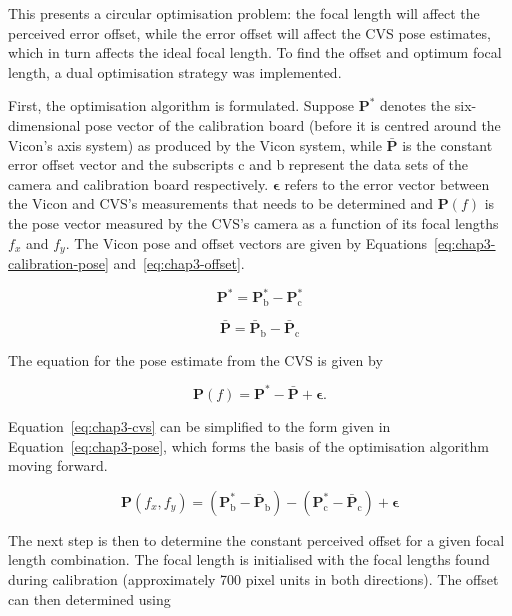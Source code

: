 This presents a circular optimisation problem: the focal length will affect the perceived error offset, while the error offset will affect the CVS pose estimates, which in turn affects the ideal focal length. To find the offset and optimum focal length, a dual optimisation strategy was implemented.  

First, the optimisation algorithm is formulated. Suppose $\bm{P}^*$ denotes the six-dimensional pose vector of the calibration board (before it is centred around the Vicon's axis system) as produced by the Vicon system, while $\bar{\bm{P}}$ is the constant error offset vector and the subscripts c and b represent the data sets of the camera and calibration board respectively. $\bm{\epsilon}$ refers to the error vector between the Vicon and CVS's measurements that needs to be determined and $\bm{P}(f)$ is the pose vector measured by the CVS's camera as a function of its focal lengths $f_x$ and $f_y$. The Vicon pose and offset vectors are given by Equations~\ref{eq:chap3-calibration-pose} and~\ref{eq:chap3-offset}.

\begin{equation}
 \label{eq:chap3-calibration-pose}
 \bm{P}^* = \bm{P}^*_\mathrm{b} - \bm{P}^*_\mathrm{c}
\end{equation}

\begin{equation}
  \label{eq:chap3-offset}
  \bar{\bm{P}} = \bar{\bm{P}}_\mathrm{b} - \bar{\bm{P}}_\mathrm{c}
\end{equation}

The equation for the pose estimate from the CVS is given by

\begin{equation}
  \label{eq:chap3-cvs}
  \bm{P}(f) = \bm{P}^* - \bar{\bm{P}} + \bm{\epsilon}.
\end{equation}

Equation~\ref{eq:chap3-cvs} can be simplified to the form given in Equation~\ref{eq:chap3-pose}, which forms the basis of the optimisation algorithm moving forward.  

\begin{equation}
  \label{eq:chap3-pose}
  \bm{P}(f_x, f_y) = (\bm{P}^*_\mathrm{b} - \bar{\bm{P}}_\mathrm{b}) - (\bm{P}^*_\mathrm{c} - \bar{\bm{P}}_\mathrm{c}) + \bm{\epsilon}
\end{equation}

The next step is then to determine the constant perceived offset for a given focal length combination. The focal length is initialised with the focal lengths found during calibration (approximately 700 pixel units in both directions). The offset can then determined using 

